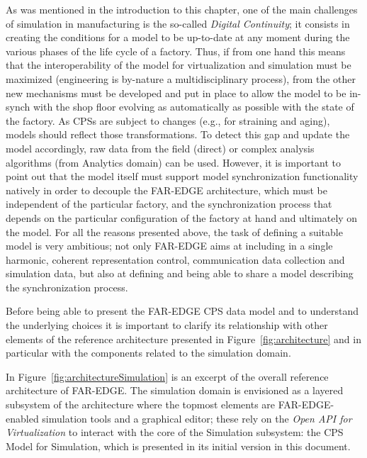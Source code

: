 As was mentioned in the introduction to this chapter, one of the main challenges of simulation in manufacturing is the so-called \textit{Digital Continuity}; it consists in creating the conditions for a model to be up-to-date at any moment during the various phases of the life cycle of a factory. 
Thus, if from one hand this means that the interoperability of the model for virtualization and simulation must be maximized (engineering is by-nature a multidisciplinary process), from the other new mechanisms must be developed and put in place to allow the model to be in-synch with the shop floor evolving as automatically as possible with the state of the factory. As CPSs are subject to changes (e.g., for straining and aging), models should reflect those transformations. To detect this gap and update the model accordingly, raw data from the field (direct) or complex analysis algorithms (from Analytics domain) can be used. However, it is important to point out that the model itself must support model synchronization functionality natively in order to decouple the FAR-EDGE architecture, which must be independent of the particular factory, and the synchronization process that depends on the particular configuration of the factory at hand and ultimately on the model. 
For all the reasons presented above, the task of defining a suitable model is very ambitious; not only FAR-EDGE aims at including in a single harmonic, coherent representation control, communication data collection and simulation data, but also at defining and being able to share a model describing the synchronization process. 

Before being able to present the FAR-EDGE CPS data model and to understand the underlying choices it is important to clarify its relationship with other elements of the reference architecture presented in Figure~\ref{fig:architecture} and in particular with the components related to the simulation domain. 

In Figure~\ref{fig:architectureSimulation} is an excerpt of the overall reference architecture of FAR-EDGE. The simulation domain is envisioned as a layered subsystem of the architecture where the topmost elements are FAR-EDGE-enabled simulation tools and a graphical editor; these rely on the \textit{Open API for Virtualization} to interact with the core of the Simulation subsystem: the CPS Model for Simulation, which is presented in its initial version in this document.

